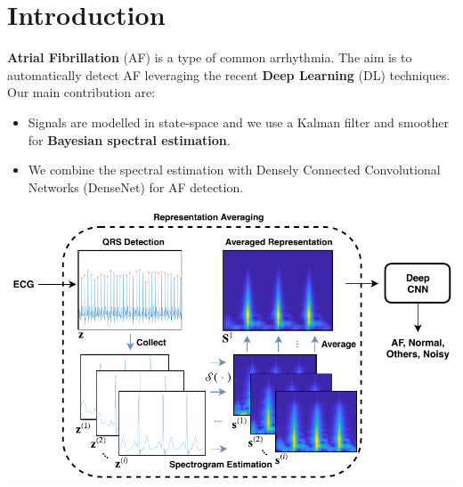 \documentclass[portrait,a0,final]{a0poster} %
\newcommand{\bfcolor}[2]{\textcolor{#1}{\textbf{#2}}}
\begin{document}

\vspace{0.04\linewidth}

\centering



\small %


\begin{minipage}{0.98\linewidth}




\begin{minipage}[t]{0.47\linewidth}
\setlength{\parindent}{10mm} %


\section*{Introduction}
\Large
\bfcolor{aaltoFuchsia}{Atrial Fibrillation} (AF) is a type of common arrhythmia. The aim is to automatically detect AF leveraging the recent \bfcolor{aaltoBlue}{Deep Learning} (DL) techniques. Our main contribution are:
\vspace{4mm}
\begin{itemize}
	\item Signals are modelled in state-space and we use a Kalman filter and smoother for \bfcolor{aaltoFuchsia}{Bayesian spectral estimation}.
	\item We combine the spectral estimation with Densely Connected Convolutional Networks (DenseNet) \cite{huang2017densely} for AF detection.
\end{itemize}
\vspace{4mm}
\begin{minipage}[c]{\linewidth}
	\centering
	\includegraphics[scale=2.2]{figures/pre-processing}
\end{minipage}



\end{minipage}
\end{minipage}
\end{document}
